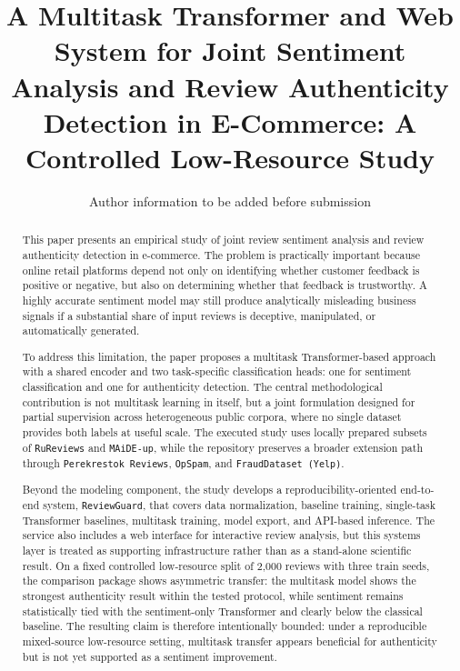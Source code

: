 \documentclass[12pt,a4paper]{article}
\title{A Multitask Transformer and Web System for Joint Sentiment Analysis and Review Authenticity Detection in E-Commerce: A Controlled Low-Resource Study}
\author{Author information to be added before submission}
\date{}
\begin{document}
\maketitle

\begin{abstract}
This paper presents an empirical study of joint review sentiment analysis and review authenticity detection in e-commerce. The problem is practically important because online retail platforms depend not only on identifying whether customer feedback is positive or negative, but also on determining whether that feedback is trustworthy. A highly accurate sentiment model may still produce analytically misleading business signals if a substantial share of input reviews is deceptive, manipulated, or automatically generated.

To address this limitation, the paper proposes a multitask Transformer-based approach with a shared encoder and two task-specific classification heads: one for sentiment classification and one for authenticity detection. The central methodological contribution is not multitask learning in itself, but a joint formulation designed for partial supervision across heterogeneous public corpora, where no single dataset provides both labels at useful scale. The executed study uses locally prepared subsets of \texttt{RuReviews} and \texttt{MAiDE-up}, while the repository preserves a broader extension path through \texttt{Perekrestok Reviews}, \texttt{OpSpam}, and \texttt{FraudDataset (Yelp)}.

Beyond the modeling component, the study develops a reproducibility-oriented end-to-end system, \texttt{ReviewGuard}, that covers data normalization, baseline training, single-task Transformer baselines, multitask training, model export, and API-based inference. The service also includes a web interface for interactive review analysis, but this systems layer is treated as supporting infrastructure rather than as a stand-alone scientific result. On a fixed controlled low-resource split of 2{,}000 reviews with three train seeds, the comparison package shows asymmetric transfer: the multitask model shows the strongest authenticity result within the tested protocol, while sentiment remains statistically tied with the sentiment-only Transformer and clearly below the classical baseline. The resulting claim is therefore intentionally bounded: under a reproducible mixed-source low-resource setting, multitask transfer appears beneficial for authenticity but is not yet supported as a sentiment improvement.
\end{abstract}
\end{document}
